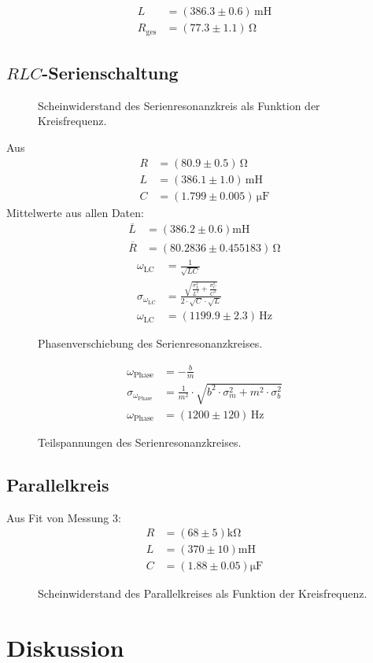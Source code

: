 \documentclass[12pt,a4paper,titlepage,headinclude,bibtotoc]{scrartcl}
\begin{document}
\begin{align}
	L&=(386.3\pm 0.6)\,\si{\milli\henry}\\
	R_\text{ges}&=(77.3 \pm 1.1)\,\si{\ohm}
\end{align}
\subsection{$RLC$-Serienschaltung}
\begin{figure}[!htb]
	\centering
	
	\caption{Scheinwiderstand des Serienresonanzkreis als Funktion der Kreisfrequenz.}
	\label{fig:messung2}
\end{figure}
Aus
\begin{align}
	R &= (80.9 \pm 0.5)\,\si{\ohm}\\
	L &= (386.1 \pm 1.0)\,\si{\milli\henry}\\
	C &= (1.799 \pm 0.005)\,\si{\micro\farad}
\end{align}
Mittelwerte aus allen Daten:
\begin{align}
\overline L&=(386.2 \pm 0.6)\si{\milli\henry}\\
\overline R&=(80.2836 \pm 0.455183)\,\si{\ohm}
\end{align}
\begin{align}
\omega_\text{LC}&=\frac{1}{\sqrt{LC}}\\
\sigma_{\omega_\text{LC}}&=\frac{\sqrt{\frac{\sigma_{L}^{2}}{L^{2}} + \frac{\sigma_{C}^{2}}{C^{2}}}}{2 \cdot \sqrt{C} \cdot \sqrt{L}}\\
\omega_\text{LC}&=(1199.9 \pm 2.3)\,\si{\hertz}
\end{align}
\begin{figure}[!htb]
	\centering
	
	\caption{Phasenverschiebung des Serienresonanzkreises.}
	\label{fig:phase}
\end{figure}

\begin{align}
\omega_\text{Phase}&=- \frac{b}{m}\\
\sigma_{\omega_\text{Phase}}&=\frac{1}{m^{2}} \cdot \sqrt{b^{2} \cdot \sigma_{m}^{2} + m^{2} \cdot \sigma_{b}^{2}}\\
\omega_\text{Phase}&=(1200 \pm 120)\,\si\hertz
\end{align}
\begin{figure}[!htb]
	\centering
	
	\caption{Teilspannungen des Serienresonanzkreises.}
	\label{fig:teilU}
\end{figure}
\subsection{Parallelkreis}
Aus Fit von Messung 3:
\begin{align}
R &= (68\pm 5)\si{\kilo\ohm}\\
L &= (370 \pm 10)\si{\milli\henry}\\
C &= (1.88  \pm 0.05) \si{\micro\farad}
\end{align}
\begin{figure}[!htb]
	\centering
	
	\caption{Scheinwiderstand des Parallelkreises als Funktion der Kreisfrequenz.}
	\label{fig:messung3}
\end{figure}

\section{Diskussion}
\label{sec:diskussion}



\end{document}
